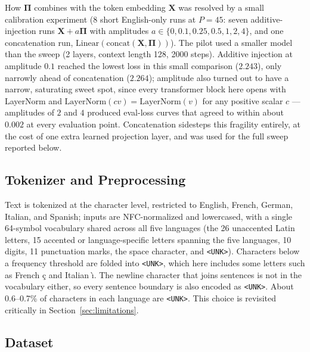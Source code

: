 \documentclass[11pt]{article}
\begin{document}
How $\mathbf{\Pi}$ combines with the token embedding $\mathbf{X}$ was resolved by a small calibration experiment (8 short English-only runs at $P = 45$: seven additive-injection runs $\mathbf{X} + a\mathbf{\Pi}$ with amplitudes $a \in \{0, 0.1, 0.25, 0.5, 1, 2, 4\}$, and one concatenation run, $\mathrm{Linear}(\mathrm{concat}(\mathbf{X}, \mathbf{\Pi}))$). The pilot used a smaller model than the sweep (2 layers, context length 128, 2000 steps). Additive injection at amplitude $0.1$ reached the lowest loss in this small comparison ($2.243$), only narrowly ahead of concatenation ($2.264$); amplitude also turned out to have a narrow, saturating sweet spot, since every transformer block here opens with LayerNorm and $\mathrm{LayerNorm}(cv) = \mathrm{LayerNorm}(v)$ for any positive scalar $c$ --- amplitudes of $2$ and $4$ produced eval-loss curves that agreed to within about $0.002$ at every evaluation point. Concatenation sidesteps this fragility entirely, at the cost of one extra learned projection layer, and was used for the full sweep reported below.

\subsection{Tokenizer and Preprocessing}

Text is tokenized at the character level, restricted to English, French, German, Italian, and Spanish; inputs are NFC-normalized and lowercased, with a single 64-symbol vocabulary shared across all five languages (the 26 unaccented Latin letters, 15 accented or language-specific letters spanning the five languages, 10 digits, 11 punctuation marks, the space character, and \texttt{<UNK>}). Characters below a frequency threshold are folded into \texttt{<UNK>}, which here includes some letters such as French \c{c} and Italian \`{\i}. The newline character that joins sentences is not in the vocabulary either, so every sentence boundary is also encoded as \texttt{<UNK>}. About 0.6--0.7\% of characters in each language are \texttt{<UNK>}. This choice is revisited critically in Section~\ref{sec:limitations}.

\subsection{Dataset}
\end{document}
